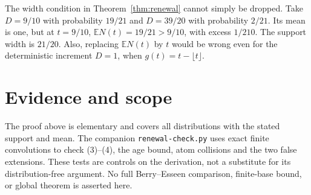 \documentclass[11pt]{article}
\newcommand{\E}{\mathbb E}\newcommand{\Pp}{\mathbb P}
\begin{document}
The width condition in Theorem~\ref{thm:renewal} cannot simply be dropped.
Take $D=9/10$ with probability $19/21$ and $D=39/20$ with probability
$2/21$. Its mean is one, but at $t=9/10$,
$\E N(t)=19/21>9/10$, with excess $1/210$.
The support width is $21/20$. Also, replacing $\E N(t)$ by $t$ would
be wrong even for the deterministic increment $D=1$, when
$g(t)=t-\lfloor t\rfloor$.

\section*{Evidence and scope}
The proof above is elementary and covers all distributions with the stated
support and mean. The companion \texttt{renewal-check.py} uses exact finite
convolutions to check (3)--(4), the age bound, atom collisions and the two
false extensions. These tests are controls on the derivation, not a substitute
for its distribution-free argument. No full Berry--Esseen comparison,
finite-base bound, or global theorem is asserted here.
\end{document}
